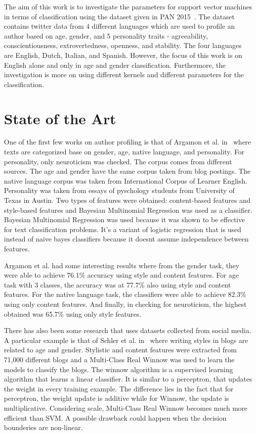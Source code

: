 \documentclass[a4paper]{llncs}
\begin{document}
The aim of this work is to investigate the parameters for support vector machines in terms of classification using the dataset given in PAN 2015~\cite{rangel:2015}. The dataset contains twitter data from 4 different languages which are used to profile an author based on age, gender, and 5 personality traits - agreeability, conscientiousness, extrovertedness, openness, and stability. The four languages are English, Dutch, Italian, and Spanish. However, the focus of this work is on English alone and only in age and gender classification. Furthermore, the investigation is more on using different kernels and different parameters for the classification.

\section{State of the Art}
One of the first few works on author profiling is that of Argamon et al. in~\cite{argamon2009automatically} where texts are categorized base on gender, age, native language, and personality. For personality, only neuroticism was checked. The corpus comes from different sources. The age and gender have the same corpus taken from blog postings. The native language corpus was taken from International Corpus of Learner English. Personality was taken from essays of pyschology students from University of Texas in Austin. Two types of features were obtained: content-based features and style-based features and Bayesian Multinomial Regression was used as a classifier. Bayesian Multinomial Regression was used because it was shown to be effective for text classification problems. It's a variant of logistic regression that is used instead of naive bayes classifiers because it doesnt assume independence between features.

Argamon et al. had some interesting results where from the gender task, they were able to achieve 76.1\% accuracy using style and content features. For age task with 3 classes, the accuracy was at 77.7\% also using style and content features. For the native language task, the classifiers were able to achieve 82.3\% using only content features. And finally, in checking for neuroticism, the highest obtained was 65.7\% using only style features. 

There has also been some research that uses datasets collected from social media. A particular example is that of Schler et al. in~\cite{schler2006effects} where writing styles in blogs are related to age and gender. Stylistic and content features were extracted from 71,000 different blogs and a Multi-Class Real Winnow was used to learn the models to classify the blogs. The winnow algorithm is a supervised learning algorithm that learns a linear classifier. It is similar to a perceptron, that updates the weight in every training example. The difference lies in the fact that for perceptron, the weight update is additive while for Winnow, the update is multiplicative. Considering scale, Multi-Class Real Winnow becomes much more efficient than SVM. A possible drawback could happen when the decision bounderies are non-linear. 
\end{document}
